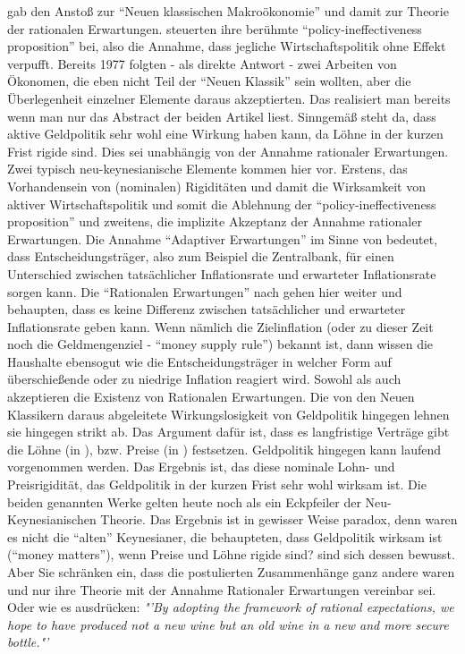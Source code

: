 \textcite{Lucas1976} gab den Anstoß zur "`Neuen klassischen Makroökonomie"' und damit zur Theorie der rationalen Erwartungen. \textcite{Sargent1975} steuerten ihre berühmte "`policy-ineffectiveness proposition"' bei, also die Annahme, dass jegliche Wirtschaftspolitik ohne Effekt verpufft. Bereits 1977 folgten - als direkte Antwort - zwei Arbeiten \textcite{Taylor1977, Fischer1977} von Ökonomen, die eben nicht Teil der "`Neuen Klassik"' sein wollten, aber die Überlegenheit einzelner Elemente daraus akzeptierten. Das realisiert man bereits wenn man nur das Abstract der beiden Artikel liest. Sinngemäß steht da, dass aktive Geldpolitik sehr wohl eine Wirkung haben kann, da Löhne in der kurzen Frist rigide sind. Dies sei unabhängig von der Annahme rationaler Erwartungen. Zwei typisch neu-keynesianische Elemente kommen hier vor. Erstens, das Vorhandensein von (nominalen) Rigiditäten und damit die Wirksamkeit von aktiver Wirtschaftspolitik und somit die Ablehnung der "`policy-ineffectiveness proposition"' und zweitens, die implizite Akzeptanz der Annahme rationaler Erwartungen.
Die Annahme "`Adaptiver Erwartungen"' im Sinne von \textcite{Phelps1968} bedeutet, dass Entscheidungsträger, also zum Beispiel die Zentralbank, für einen Unterschied zwischen tatsächlicher Inflationsrate und erwarteter Inflationsrate sorgen kann. Die "`Rationalen Erwartungen"' nach \textcite{Lucas1976} gehen hier weiter und behaupten, dass es keine Differenz zwischen tatsächlicher und erwarteter Inflationsrate geben kann. Wenn nämlich die Zielinflation (oder zu dieser Zeit noch die Geldmengenziel - "`money supply rule"') bekannt ist, dann wissen die Haushalte ebensogut wie die Entscheidungsträger in welcher Form auf überschießende oder zu niedrige Inflation reagiert wird.  Sowohl \textcite{Fischer1977} als auch \textcite{Taylor1977} akzeptieren die Existenz von Rationalen Erwartungen. Die von den Neuen Klassikern daraus abgeleitete Wirkungslosigkeit von Geldpolitik hingegen lehnen sie hingegen strikt ab. Das Argument dafür ist, dass es langfristige Verträge gibt die Löhne (in \textcite{Fischer1977}), bzw. Preise (in \textcite{Taylor1977}) festsetzen. Geldpolitik hingegen kann laufend vorgenommen werden. Das Ergebnis ist, das diese nominale Lohn- und Preisrigidität, das Geldpolitik in der kurzen Frist sehr wohl wirksam ist. Die beiden genannten Werke gelten heute noch als ein Eckpfeiler der Neu-Keynesianischen Theorie. Das Ergebnis ist in gewisser Weise paradox, denn waren es nicht die "`alten"' Keynesianer, die behaupteten, dass Geldpolitik wirksam ist ("`money matters"'), wenn Preise und Löhne rigide sind? \textcite[S. 166]{Taylor1977} sind sich dessen bewusst. Aber Sie schränken ein, dass die postulierten Zusammenhänge ganz andere waren und nur ihre Theorie mit der Annahme Rationaler Erwartungen vereinbar sei. Oder wie es \textcite[S. 166]{Taylor1977} ausdrücken: \textit{"'By adopting the framework of rational expectations, we hope to have produced not a new wine but an old wine in a new and more secure bottle."'}
